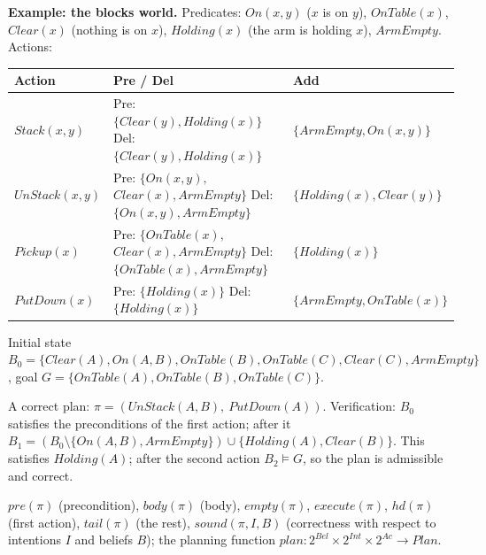 \documentclass[11pt,a4paper]{article}
\theoremstyle{definition}
\begin{document}
\medskip
\noindent\textbf{Example: the blocks world.}
Predicates: $\mathit{On}(x,y)$ ($x$ is on $y$), $\mathit{OnTable}(x)$, $\mathit{Clear}(x)$
(nothing is on $x$), $\mathit{Holding}(x)$ (the arm is holding $x$), $\mathit{ArmEmpty}$.
Actions:
\begin{center}
\small
\begin{tabular}{p{} p{} p{}}
\toprule
\textbf{Action} & \textbf{Pre / Del} & \textbf{Add} \\
\midrule
$\mathit{Stack}(x,y)$
  & Pre: $\{\mathit{Clear}(y), \mathit{Holding}(x)\}$ \newline
    Del: $\{\mathit{Clear}(y), \mathit{Holding}(x)\}$
  & $\{\mathit{ArmEmpty}, \mathit{On}(x,y)\}$ \\
$\mathit{UnStack}(x,y)$
  & Pre: $\{\mathit{On}(x,y),$ $\mathit{Clear}(x),\mathit{ArmEmpty}\}$ \newline
    Del: $\{\mathit{On}(x,y),\mathit{ArmEmpty}\}$
  & $\{\mathit{Holding}(x), \mathit{Clear}(y)\}$ \\
$\mathit{Pickup}(x)$
  & Pre: $\{\mathit{OnTable}(x),$ $\mathit{Clear}(x),\mathit{ArmEmpty}\}$ \newline
    Del: $\{\mathit{OnTable}(x),\mathit{ArmEmpty}\}$
  & $\{\mathit{Holding}(x)\}$ \\
$\mathit{PutDown}(x)$
  & Pre: $\{\mathit{Holding}(x)\}$ \newline
    Del: $\{\mathit{Holding}(x)\}$
  & $\{\mathit{ArmEmpty}, \mathit{OnTable}(x)\}$ \\
\bottomrule
\end{tabular}
\end{center}
Initial state $B_0 = \{\mathit{Clear}(A), \mathit{On}(A,B), \mathit{OnTable}(B),
\mathit{OnTable}(C), \mathit{Clear}(C), \mathit{ArmEmpty}\}$,
goal $G = \{\mathit{OnTable}(A), \mathit{OnTable}(B), \mathit{OnTable}(C)\}$.

\noindent A correct plan: $\pi = (\mathit{UnStack}(A,B),\ \mathit{PutDown}(A))$. Verification:
$B_0$ satisfies the preconditions of the first action; after it
$B_1 = (B_0 \setminus \{\mathit{On}(A,B),\mathit{ArmEmpty}\}) \cup
\{\mathit{Holding}(A),\mathit{Clear}(B)\}$. This satisfies $\mathit{Holding}(A)$; after the
second action $B_2 \models G$, so the plan is admissible and correct.

\begin{defbox}
$\mathit{pre}(\pi)$ (precondition), $\mathit{body}(\pi)$ (body), $\mathit{empty}(\pi)$,
$\mathit{execute}(\pi)$, $\mathit{hd}(\pi)$ (first action), $\mathit{tail}(\pi)$ (the rest),
$\mathit{sound}(\pi,I,B)$ (correctness with respect to intentions $I$ and beliefs $B$);
the planning function
$\mathit{plan} : 2^{\mathit{Bel}} \times 2^{\mathit{Int}} \times 2^{\mathit{Ac}} \to \mathit{Plan}$.
\end{defbox}
\end{document}
